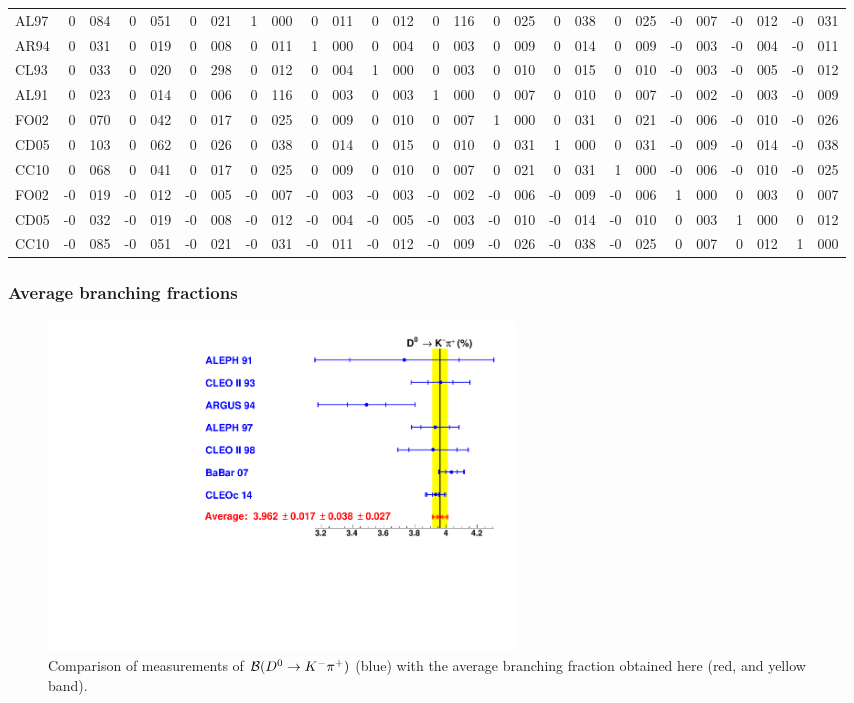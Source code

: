 \begin{table}
\begin{tabular}{lr@{.}lr@{.}lr@{.}lr@{.}lr@{.}lr@{.}lr@{.}lr@{.}lr@{.}lr@{.}lr@{.}lr@{.}lr@{.}l}
AL97 & 0&084 & 0&051 & 0&021 & 1&000 & 0&011 & 0&012 & 0&116 & 0&025 & 0&038 & 0&025 &-0&007 &-0&012 &-0&031 \\
AR94 & 0&031 & 0&019 & 0&008 & 0&011 & 1&000 & 0&004 & 0&003 & 0&009 & 0&014 & 0&009 &-0&003 &-0&004 &-0&011 \\
CL93 & 0&033 & 0&020 & 0&298 & 0&012 & 0&004 & 1&000 & 0&003 & 0&010 & 0&015 & 0&010 &-0&003 &-0&005 &-0&012 \\
AL91 & 0&023 & 0&014 & 0&006 & 0&116 & 0&003 & 0&003 & 1&000 & 0&007 & 0&010 & 0&007 &-0&002 &-0&003 &-0&009 \\
FO02 & 0&070 & 0&042 & 0&017 & 0&025 & 0&009 & 0&010 & 0&007 & 1&000 & 0&031 & 0&021 &-0&006 &-0&010 &-0&026 \\
CD05 & 0&103 & 0&062 & 0&026 & 0&038 & 0&014 & 0&015 & 0&010 & 0&031 & 1&000 & 0&031 &-0&009 &-0&014 &-0&038 \\
CC10 & 0&068 & 0&041 & 0&017 & 0&025 & 0&009 & 0&010 & 0&007 & 0&021 & 0&031 & 1&000 &-0&006 &-0&010 &-0&025 \\
FO02 &-0&019 &-0&012 &-0&005 &-0&007 &-0&003 &-0&003 &-0&002 &-0&006 &-0&009 &-0&006 & 1&000 & 0&003 & 0&007 \\
CD05 &-0&032 &-0&019 &-0&008 &-0&012 &-0&004 &-0&005 &-0&003 &-0&010 &-0&014 &-0&010 & 0&003 & 1&000 & 0&012 \\
CC10 &-0&085 &-0&051 &-0&021 &-0&031 &-0&011 &-0&012 &-0&009 &-0&026 &-0&038 &-0&025 & 0&007 & 0&012 & 1&000 \\
\hline
\end{tabular}
\end{table}


\subsubsection{Average branching fractions}
\begin{figure}
\begin{center}
\includegraphics[width=0.6\textwidth,angle=0.]{figures/charm/D0Kpi_2014.pdf}
\caption{Comparison of measurements of 
${\cal B}(D^0\to K^-\pi^+)$ (blue) with the average 
branching fraction obtained here (red, and yellow band).}
\label{D0bfs}
\end{center}
\end{figure}

